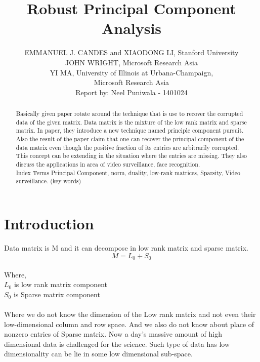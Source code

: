 \documentclass[journal, a4paper]{IEEEtran}
\begin{document}
	\title{Robust Principal Component Analysis}
	\author{EMMANUEL J. CANDES and XIAODONG LI, Stanford University 
		\\JOHN WRIGHT, Microsoft Research Asia \\
		YI MA, University of Illinois at Urbana-Champaign,\\ Microsoft Research Asia\\
		\vspace{1cm}
		Report by: Neel Puniwala - 1401024}
		
	\maketitle
\begin{abstract}
	Basically given paper rotate around the technique that is use to recover the corrupted data of the given matrix. Data matrix is the mixture of the low rank matrix and sparse matrix. In paper, they introduce a new technique named principle component pursuit. Also the result of the paper claim that one can recover the principal component of the data matrix even though the positive fraction of its entries are arbitrarily corrupted. This concept can be extending in the situation where the entries are missing. They also discuss the applications in area of video surveillance, face recognition.\\
	Index Terms \textendash Principal Component, norm, duality, low-rank matrices, Sparsity, Video surveillance. (key words)
\end{abstract}


\section{Introduction}
	 Data matrix is M and it can decompose in low rank matrix and sparse matrix.\\
	$$M=L_0 + S_0$$\\
	Where,\\
	 $L_0$ is low rank matrix component\\
	 $S_0$ is Sparse matrix component\\
	\\Where we do not know the dimension of the Low rank matrix and not even their low-dimensional column and row space. And we also do not know about place of nonzero entries of Sparse matrix. Now a day’s massive amount of high dimensional data is challenged for the science. Such type of data has low dimensionality can be lie in some low dimensional sub-space. 
	
\end{document}
